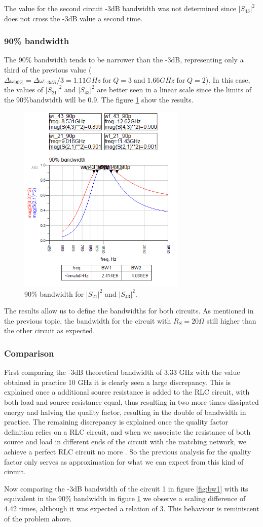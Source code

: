The value for the second circuit -3dB bandwidth was not determined since $|S_{43}|^2$ does not cross the -3dB value a second time.

\subsubsection{90\% bandwidth}

The 90\% bandwidth tends to be narrower than the -3dB, representing only a third of the previous value ($\Delta\omega_{90\%} = \Delta\omega_{-3dB}/3 = 1.11 GHz \; \text{for} \; Q=3 \; \text{and} \; 1.66 GHz \; \text{for} \; Q=2 $). In this case, the values of $|S_{21}|^2$ and $|S_{43}|^2$ are better seen in a linear scale since the limits of the 90\%bandwidth will be 0.9. The figure \ref{fig:bw2} show the results.

\begin{figure}[H] 
\centering
\includegraphics[width=8cm]{images/BW2.PNG}
\caption{90\% bandwidth for $|S_{21}|^2$ and $|S_{43}|^2$.}
\label{fig:bw2} 
\end{figure}

The results allow us to define the bandwidths for both circuits. As mentioned in the previous topic, the bandwidth for the circuit with $R_S = 20 \Omega$ still higher than the other circuit as expected.

\subsubsection{Comparison}

First comparing the -3dB theoretical bandwidth of 3.33 GHz with the value obtained in practice 10 GHz it is clearly seen a large discrepancy. This is explained once a additional source resistance is added to the RLC circuit, with both load and source resistance equal, thus resulting in two more times dissipated energy and halving the quality factor, resulting in the double of bandwidth in practice. The remaining discrepancy is explained once the quality factor definition relies on a RLC circuit, and when we associate the resistance of both source and load in different ends of the circuit with the matching network, we achieve a perfect RLC circuit no more . So the previous analysis for the quality factor only serves as approximation for what we can expect from this kind of circuit.

Now comparing the -3dB bandwidth of the circuit 1 in figure \ref{fig:bw1} with its equivalent in the 90\% bandwidth in figure \ref{fig:bw2} we observe a scaling difference of 4.42 times, although it was expected a relation of 3. This behaviour is reminiscent of the problem above.

